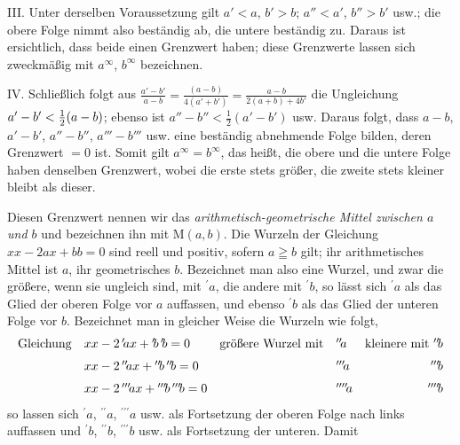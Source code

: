 \par
{}
III. Unter derselben Voraussetzung gilt $a'<a$, $b'>b$; $a''<a'$, $b''>b'$ usw.; die obere
Folge nimmt also beständig ab, die untere beständig zu. Daraus ist ersichtlich,
dass beide einen Grenzwert haben; diese Grenzwerte lassen sich zweckmäßig mit $a^{\infty}$, $b^{\infty}$ bezeichnen.
\par
{}
IV. Schließlich folgt aus $\frac{a'-b'}{a-b}=\frac{(a-b)}{4(a'+b')}=\frac{a-b}{2(a+b)+4b'}$ die Ungleichung $a'-\nobreak{}b'<\nobreak{}\tfrac12(a-\nobreak{}b)$;
ebenso ist $a''-b''<\tfrac12(a'-b')$ usw. Daraus folgt, dass $a-b$, $a'-b'$,
$a''-b''$, $a'''-b'''$ usw. eine beständig abnehmende Folge bilden, deren
Grenzwert $=0$ ist. Somit gilt $a^{\infty}=b^{\infty}$, das heißt, die obere und die untere Folge haben denselben
Grenzwert, wobei die erste stets größer, die zweite stets kleiner bleibt als dieser.
\par
Diesen Grenzwert nennen wir das \textit{arithmetisch-geometrische Mittel zwischen $a$ und $b$}
und bezeichnen ihn mit $\mathrm{M}(a,b)$.
Die Wurzeln der Gleichung $xx-2ax+bb=0$ sind reell und positiv, sofern
$a\geqq b$ gilt; ihr arithmetisches Mittel ist $a$, ihr geometrisches $b$. Bezeichnet
man also eine Wurzel, und zwar die größere, wenn sie ungleich sind, mit ${}^{\prime}\!a$, die andere mit ${}^{\prime}\!b$, so lässt sich ${}^{\prime}\!a$ als das Glied der oberen Folge vor $a$ auffassen, und ebenso ${}^{\prime}\!b$ als das Glied der unteren Folge vor $b$. Bezeichnet man in gleicher Weise die Wurzeln wie folgt,
\begingroup\fontsize{9}{11}\selectfont
\begingroup\setlength{\arraycolsep}{2pt}
\[
\begin{array}{@{}lllll@{}}
\mathrm{Gleichung}&xx-2\,{}^{\prime}\!ax+{}^{\prime}\!b\,{}^{\prime}\!b=0&\mbox{größere Wurzel mit}&{}^{\prime\prime}\!a&\mathrm{kleinere\ mit}\ {}^{\prime\prime}\!b\\[6pt]
&xx-2\,{}^{\prime\prime}\!ax+{}^{\prime\prime}\!b\,{}^{\prime\prime}\!b=0&&{}^{\prime\prime\prime}\!a&\hfill{}^{\prime\prime\prime}\!b\\[6pt]
&xx-2\,{}^{\prime\prime\prime}\!ax+{}^{\prime\prime\prime}\!b\,{}^{\prime\prime\prime}\!b=0&&{}^{\prime\prime\prime\prime}\!a&\hfill{}^{\prime\prime\prime\prime}\!b
\end{array}
\]\endgroup
\endgroup
so lassen sich ${}^{\prime}\!a$, ${}^{\prime\prime}\!a$, ${}^{\prime\prime\prime}\!a$ usw. als Fortsetzung der oberen Folge nach links auffassen und ${}^{\prime}\!b$, ${}^{\prime\prime}\!b$, ${}^{\prime\prime\prime}\!b$ usw. als Fortsetzung der unteren. Damit
